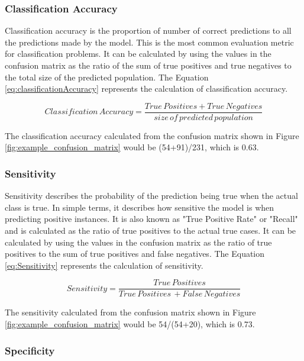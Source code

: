 \documentclass[11pt,openright]{report}
\begin{document}
\subsubsection{Classification Accuracy}
Classification accuracy is the proportion of number of correct predictions to all the predictions made by the model. This is the most common evaluation metric for classification problems. It can be calculated by using the values in the confusion matrix as the ratio of the sum of true positives and true negatives to the total size of the predicted population. The Equation \ref{eq:classificationAccuracy}  represents the calculation of classification accuracy.

\begin{equation}
Classification\, Accuracy = \dfrac{True\, Positives + True\, Negatives}{size\, of\, predicted\, population} \label{eq:classificationAccuracy} 
 \end{equation}

The classification accuracy calculated from the confusion matrix shown in Figure \ref{fig:example_confusion_matrix} would be (54+91)/231, which is 0.63.

\subsubsection{Sensitivity}

Sensitivity describes the probability of the prediction being true when the actual class is true. In simple terms, it describes how sensitive the model is when predicting positive instances. It is also known as "True Positive Rate" or "Recall" and is calculated as the ratio of true positives to the actual true cases. It can be calculated by using the values in the confusion matrix as the ratio of true positives to the sum of true positives and false negatives. The Equation \ref{eq:Sensitivity}  represents the calculation of sensitivity.

\begin{equation}
Sensitivity = \dfrac{True\, Positives }{True\, Positives\, + False\, Negatives} \label{eq:Sensitivity} 
 \end{equation}

The sensitivity calculated from the confusion matrix shown in Figure \ref{fig:example_confusion_matrix} would be 54/(54+20), which is 0.73.


\subsubsection{Specificity}
\end{document}
